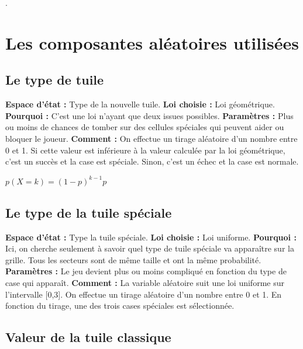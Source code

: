 \documentclass[a4paper, 12pt]{report}
\begin{document}
\vspace{0.5cm}

\tabto{1cm}.

\chapter{Les composantes aléatoires utilisées}

\begin{flushleft}

\section{Le type de tuile}

\textbf{Espace d'état :} Type de la nouvelle tuile.\break
\textbf{Loi choisie :} Loi géométrique.\break
\textbf{Pourquoi :} C’est une loi n’ayant que deux issues possibles.\break
\textbf{Paramètres :} Plus ou moins de chances de tomber sur des cellules spéciales qui peuvent aider ou bloquer le joueur.\break
\textbf{Comment :} On effectue un tirage aléatoire d’un nombre entre 0 et 1. Si cette valeur est inférieure à la valeur calculée par la loi géométrique, c’est un succès et la case est spéciale. 
Sinon, c’est un échec et la case est normale.\break

\begin{center}
${p(X=k)=(1-p)^{k-1}p}$
\end{center}

\section{Le type de la tuile spéciale}

\textbf{Espace d'état :} Type la tuile spéciale.\break
\textbf{Loi choisie :} Loi uniforme.\break
\textbf{Pourquoi :} Ici, on cherche seulement à savoir quel type de tuile spéciale va apparaître sur la grille. Tous les secteurs sont de même taille et ont la même probabilité.\break
\textbf{Paramètres :} Le jeu devient plus ou moins compliqué en fonction du type de case qui apparaît.\break
\textbf{Comment :} La variable aléatoire suit une loi uniforme sur l'intervalle [0,3]. On effectue un tirage aléatoire d’un nombre entre 0 et 1. En fonction du tirage, une des trois cases spéciales est sélectionnée.\break

\section{Valeur de la tuile classique}


\end{flushleft}
\end{document}
